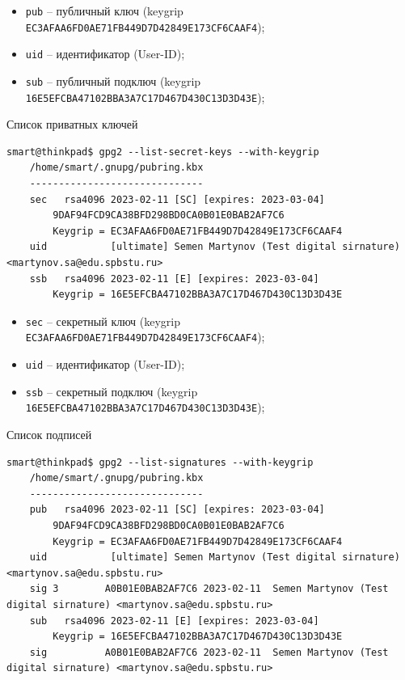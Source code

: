 \begin{itemize}
    \item \texttt{pub} -- публичный ключ (keygrip \texttt{EC3AFAA6FD0AE71FB449D7D42849E173CF6CAAF4});
    \item \texttt{uid} -- идентификатор (User-ID);
    \item \texttt{sub} -- публичный подключ (keygrip \texttt{16E5EFCBA47102BBA3A7C17D467D430C13D3D43E});
\end{itemize}

Список приватных ключей
\begin{Verbatim}[frame=single]
    smart@thinkpad$ gpg2 --list-secret-keys --with-keygrip
    /home/smart/.gnupg/pubring.kbx
    ------------------------------
    sec   rsa4096 2023-02-11 [SC] [expires: 2023-03-04]
        9DAF94FCD9CA38BFD298BD0CA0B01E0BAB2AF7C6
        Keygrip = EC3AFAA6FD0AE71FB449D7D42849E173CF6CAAF4
    uid           [ultimate] Semen Martynov (Test digital sirnature) <martynov.sa@edu.spbstu.ru>
    ssb   rsa4096 2023-02-11 [E] [expires: 2023-03-04]
        Keygrip = 16E5EFCBA47102BBA3A7C17D467D430C13D3D43E
\end{Verbatim}

\begin{itemize}
    \item \texttt{sec} -- секретный ключ (keygrip \texttt{EC3AFAA6FD0AE71FB449D7D42849E173CF6CAAF4});
    \item \texttt{uid} -- идентификатор (User-ID);
    \item \texttt{ssb} -- секретный подключ (keygrip \texttt{16E5EFCBA47102BBA3A7C17D467D430C13D3D43E});
\end{itemize}

Список подписей
\begin{Verbatim}[frame=single]
    smart@thinkpad$ gpg2 --list-signatures --with-keygrip
    /home/smart/.gnupg/pubring.kbx
    ------------------------------
    pub   rsa4096 2023-02-11 [SC] [expires: 2023-03-04]
        9DAF94FCD9CA38BFD298BD0CA0B01E0BAB2AF7C6
        Keygrip = EC3AFAA6FD0AE71FB449D7D42849E173CF6CAAF4
    uid           [ultimate] Semen Martynov (Test digital sirnature) <martynov.sa@edu.spbstu.ru>
    sig 3        A0B01E0BAB2AF7C6 2023-02-11  Semen Martynov (Test digital sirnature) <martynov.sa@edu.spbstu.ru>
    sub   rsa4096 2023-02-11 [E] [expires: 2023-03-04]
        Keygrip = 16E5EFCBA47102BBA3A7C17D467D430C13D3D43E
    sig          A0B01E0BAB2AF7C6 2023-02-11  Semen Martynov (Test digital sirnature) <martynov.sa@edu.spbstu.ru>
\end{Verbatim}

